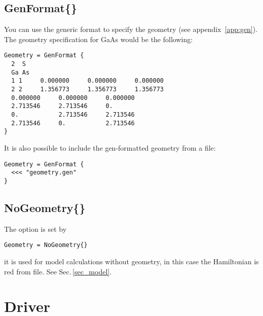 \subsection{GenFormat\{\}}
\label{sec:dftbp.GenFormat}

You can use the generic format to specify the geometry (see
appendix~\ref{app:gen}). The geometry specification for GaAs would be
the following:
\begin{verbatim}
Geometry = GenFormat {
  2  S
  Ga As
  1 1     0.000000     0.000000     0.000000
  2 2     1.356773     1.356773     1.356773
  0.000000     0.000000     0.000000
  2.713546     2.713546     0.
  0.           2.713546     2.713546
  2.713546     0.           2.713546
}
\end{verbatim}
It is also possible to include the gen-formatted geometry from a file:
\begin{verbatim}
Geometry = GenFormat {
  <<< "geometry.gen"
}
\end{verbatim}

{\new
\subsection{NoGeometry\{\}}

The  option is set by

\begin{verbatim}
Geometry = NoGeometry{}
\end{verbatim}

it is used for model calculations without geometry, in this case the Hamiltonian is red from file. See Sec.\,\ref{sec_model}.

} %

\section{Driver}
\label{sec:dftbp.Driver}

